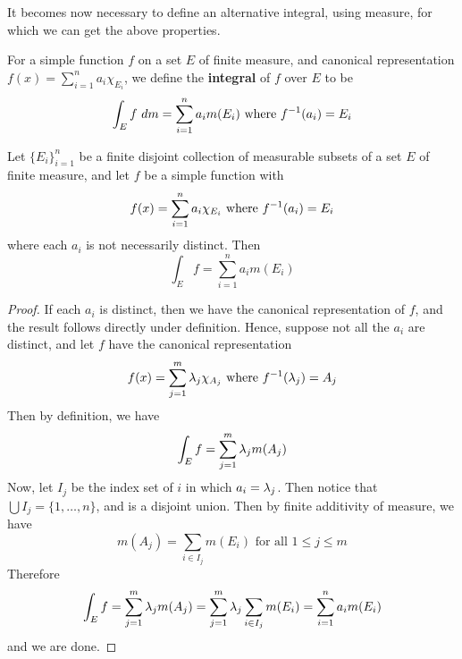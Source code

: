 It becomes now necessary to define an alternative integral, using measure, for
which we can get the above properties.

\begin{definition}
    For a simple function $f$ on a set  $E$ of finite measure, and canonical
    representation $f(x)=\sum_{i=1}^n{a_i\chi_{E_i}}$, we define the
    \textbf{integral} of $f$ over  $E$ to be
    \begin{equation*}
        \int_E{f \ dm}=\sum_{i=1}^n{a_im(E_i)} \text{ where } \inv{f}(a_i)=E_i
    \end{equation*}
\end{definition}

\begin{lemma}\label{10.1.1}
    Let $\{E_i\}_{i=1}^n$ be a finite disjoint collection of measurable subsets
    of a set $E$ of finite measure, and let $f$ be a simple function with
    \begin{equation*}
        f(x)=\sum_{i=1}^n{a_i\chi_{E_i}} \text{ where } f^{-1}(a_i)=E_i
    \end{equation*}
    where each $a_i$ is not necessarily distinct. Then
    \begin{equation*}
        \int_E{f}=\sum_{i=1}^n{a_im(E_i)}
    \end{equation*}
\end{lemma}
\begin{proof}
    If each $a_i$ is distinct, then we have the canonical representation of
    $f$, and the result follows directly under definition. Hence, suppose not
    all the  $a_i$ are distinct, and let $f$ have the canonical representation
    \begin{equation*}
        f(x)=\sum_{j=1}^m{\lambda_j\chi_{A_j}} \text{ where } f^{-1}(\lambda_j)=A_j
    \end{equation*}
    Then by definition, we have
    \begin{equation*}
        \int_E{f}=\sum_{j=1}^m{\lambda_jm(A_j)}
    \end{equation*}
    Now, let $I_j$ be the index set of  $i$ in which  $a_i=\lambda_j$. Then notice
    that  $\bigcup{I_j}=\{1, \dots, n\}$, and is a disjoint union. Then by
    finite additivity of measure, we have
    \begin{equation*}
        m(A_j)=\sum_{i \in I_j}{m(E_i)} \text{ for all } 1 \leq j \leq m
    \end{equation*}
    Therefore
    \begin{equation*}
        \int_E{f}=\sum_{j=1}^m{\lambda_jm(A_j)}=\sum_{j=1}^m{\lambda_j\sum_{i \in
        I_j}{m(E_i)}}=\sum_{i=1}^n{a_im(E_i)}
    \end{equation*}
    and we are done.
\end{proof}

